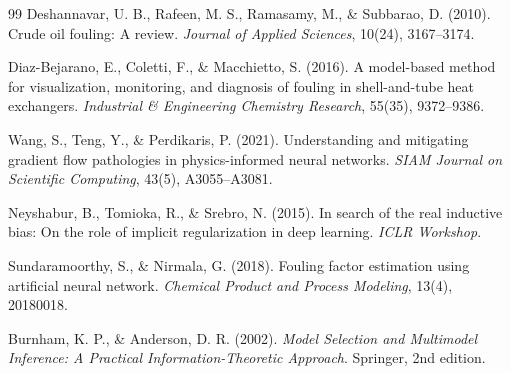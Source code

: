 \documentclass[review]{elsarticle}
\begin{document}
\begin{thebibliography}{99}
Deshannavar, U. B., Rafeen, M. S., Ramasamy, M., \& Subbarao, D. (2010).
Crude oil fouling: A review.
\textit{Journal of Applied Sciences}, 10(24), 3167--3174.

Diaz-Bejarano, E., Coletti, F., \& Macchietto, S. (2016).
A model-based method for visualization, monitoring, and diagnosis of fouling in shell-and-tube heat exchangers.
\textit{Industrial \& Engineering Chemistry Research}, 55(35), 9372--9386.

Wang, S., Teng, Y., \& Perdikaris, P. (2021).
Understanding and mitigating gradient flow pathologies in physics-informed neural networks.
\textit{SIAM Journal on Scientific Computing}, 43(5), A3055--A3081.

Neyshabur, B., Tomioka, R., \& Srebro, N. (2015).
In search of the real inductive bias: On the role of implicit regularization in deep learning.
\textit{ICLR Workshop}.

Sundaramoorthy, S., \& Nirmala, G. (2018).
Fouling factor estimation using artificial neural network.
\textit{Chemical Product and Process Modeling}, 13(4), 20180018.

Burnham, K. P., \& Anderson, D. R. (2002).
\textit{Model Selection and Multimodel Inference: A Practical Information-Theoretic Approach}.
Springer, 2nd edition.

\end{thebibliography}
\end{document}
